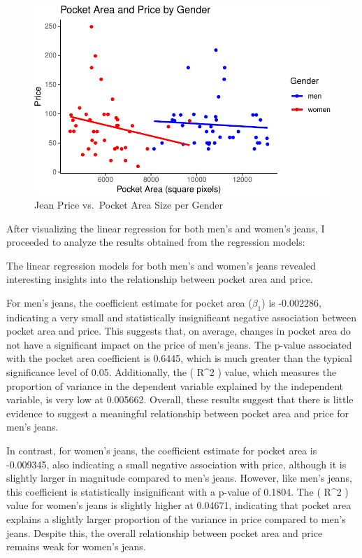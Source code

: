 \documentclass[
  letterpaper,
  DIV=11,
  numbers=noendperiod]{scrartcl}
\begin{document}
\begin{figure}

{\centering \includegraphics{paper_files/figure-pdf/fig-price_per_pocket_gender-1.pdf}

}

\caption{\label{fig-price_per_pocket_gender}Jean Price vs.~Pocket Area
Size per Gender}

\end{figure}

After visualizing the linear regression for both men's and women's
jeans, I proceeded to analyze the results obtained from the regression
models:

The linear regression models for both men's and women's jeans revealed
interesting insights into the relationship between pocket area and
price.

For men's jeans, the coefficient estimate for pocket area (\(\beta_1\))
is -0.002286, indicating a very small and statistically insignificant
negative association between pocket area and price. This suggests that,
on average, changes in pocket area do not have a significant impact on
the price of men's jeans. The p-value associated with the pocket area
coefficient is 0.6445, which is much greater than the typical
significance level of 0.05. Additionally, the ( R\^{}2 ) value, which
measures the proportion of variance in the dependent variable explained
by the independent variable, is very low at 0.005662. Overall, these
results suggest that there is little evidence to suggest a meaningful
relationship between pocket area and price for men's jeans.

In contrast, for women's jeans, the coefficient estimate for pocket area
is -0.009345, also indicating a small negative association with price,
although it is slightly larger in magnitude compared to men's jeans.
However, like men's jeans, this coefficient is statistically
insignificant with a p-value of 0.1804. The ( R\^{}2 ) value for women's
jeans is slightly higher at 0.04671, indicating that pocket area
explains a slightly larger proportion of the variance in price compared
to men's jeans. Despite this, the overall relationship between pocket
area and price remains weak for women's jeans.
\end{document}

